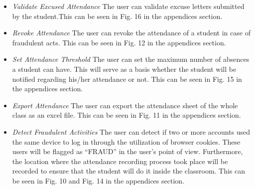 \documentclass[journal]{./IEEE/IEEEtran}
\begin{document}
\begin{enumerate}
\begin{itemize}
         \item \textit{Validate Excused Attendance}
        \newline
        The user can validate excuse letters submitted by the student.This can be seen in Fig. 16 in the appendices section.
         \item \textit{Revoke Attendance}
        \newline
        The user can revoke the attendance of a student in case of fraudulent acts. This can be seen in Fig. 12 in the appendices section.
         \item \textit{Set Attendance Threshold}
        \newline
        The user can set the maximum number of absences a student can have. This will serve as a basis whether the student will be notified regarding his/her attendance or not. This can be seen in Fig. 15 in the appendices section.
         \item \textit{Export Attendance}
        \newline
        The user can export the attendance sheet of the whole class as an excel file. This can be seen in Fig. 11 in the appendices section.
        \item \textit{Detect Fraudulent Activities}
         \newline
        The user can detect if two or more accounts used the same device to log in through the utilization of browser cookies. These users will be flagged as “FRAUD” in the user’s point of view. Furthermore, the location where the attendance recording process took place will be recorded to ensure that the student will do it inside the classroom. This can be seen in Fig. 10 and Fig. 14 in the appendices section.
       

\end{itemize}
\end{enumerate}
\end{document}
